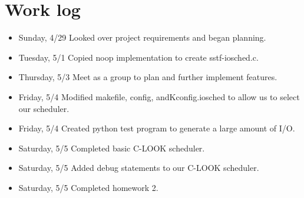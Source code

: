 \documentclass[journal,10pt,onecolumn,letterpaper,draftclsnofoot]{IEEEtran}
\begin{document}
\section{Work log}

\begin{itemize}
\item Sunday, 4/29 Looked over project requirements and began planning.
\item Tuesday, 5/1 Copied noop implementation to create sstf-iosched.c.
\item Thursday, 5/3 Meet as a group to plan and further implement features.
\item Friday, 5/4 Modified makefile, config, andKconfig.iosched to allow us to select our scheduler.
\item Friday, 5/4 Created python test program to generate a large amount of I/O.
\item Saturday, 5/5 Completed basic C-LOOK scheduler.
\item Saturday, 5/5 Added debug statements to our C-LOOK scheduler.
\item Saturday, 5/5 Completed homework 2.
\end{itemize}
\end{document}
